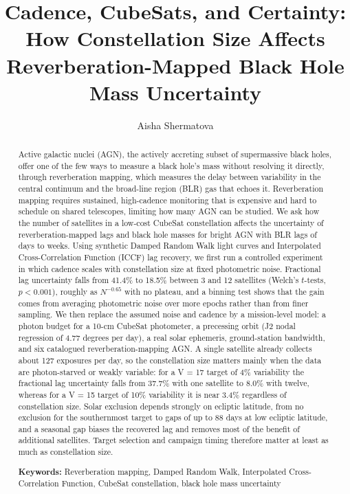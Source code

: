 \documentclass[11pt]{article}
\title{Cadence, CubeSats, and Certainty: How Constellation Size Affects Reverberation-Mapped Black Hole Mass Uncertainty}
\author{Aisha Shermatova}
\date{}
\begin{document}
\maketitle


\begin{abstract}
Active galactic nuclei (AGN), the actively accreting subset of supermassive black holes, offer one of the few ways to measure a black hole's mass without resolving it directly, through reverberation mapping, which measures the delay between variability in the central continuum and the broad-line region (BLR) gas that echoes it. Reverberation mapping requires sustained, high-cadence monitoring that is expensive and hard to schedule on shared telescopes, limiting how many AGN can be studied. We ask how the number of satellites in a low-cost CubeSat constellation affects the uncertainty of reverberation-mapped lags and black hole masses for bright AGN with BLR lags of days to weeks. Using synthetic Damped Random Walk light curves and Interpolated Cross-Correlation Function (ICCF) lag recovery, we first run a controlled experiment in which cadence scales with constellation size at fixed photometric noise. Fractional lag uncertainty falls from 41.4\% to 18.5\% between 3 and 12 satellites (Welch's $t$-tests, $p<0.001$), roughly as $N^{-0.65}$ with no plateau, and a binning test shows that the gain comes from averaging photometric noise over more epochs rather than from finer sampling. We then replace the assumed noise and cadence by a mission-level model: a photon budget for a 10-cm CubeSat photometer, a precessing orbit (J2 nodal regression of 4.77 degrees per day), a real solar ephemeris, ground-station bandwidth, and six catalogued reverberation-mapping AGN. A single satellite already collects about 127 exposures per day, so the constellation size matters mainly when the data are photon-starved or weakly variable: for a V = 17 target of 4\% variability the fractional lag uncertainty falls from 37.7\% with one satellite to 8.0\% with twelve, whereas for a V = 15 target of 10\% variability it is near 3.4\% regardless of constellation size. Solar exclusion depends strongly on ecliptic latitude, from no exclusion for the southernmost target to gaps of up to 88 days at low ecliptic latitude, and a seasonal gap biases the recovered lag and removes most of the benefit of additional satellites. Target selection and campaign timing therefore matter at least as much as constellation size.

\vspace{0.5em}
\noindent\textbf{Keywords:} Reverberation mapping, Damped Random Walk, Interpolated Cross-Correlation Function, CubeSat constellation, black hole mass uncertainty
\end{abstract}
\end{document}
